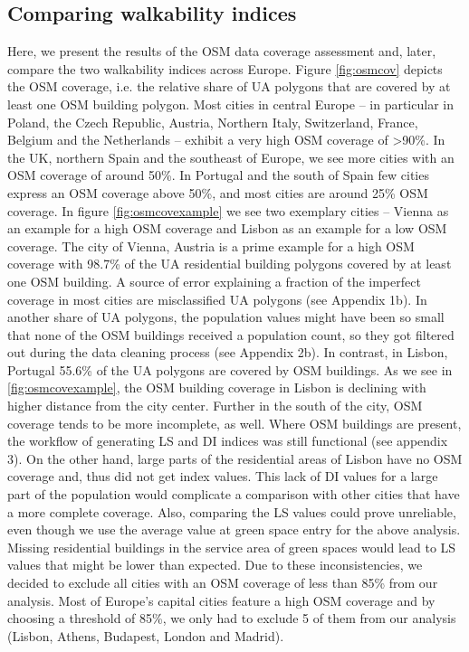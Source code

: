 \documentclass[10pt]{article}
\begin{document}
\subsection{Comparing walkability indices}
Here, we present the results of the OSM data coverage assessment and, later, compare the two walkability indices across Europe.
Figure \ref{fig:osmcov} depicts the OSM coverage, i.e. the relative share of UA polygons that are covered by at least one OSM building polygon. 
Most cities in central Europe – in particular in Poland, the Czech Republic, Austria, Northern Italy, Switzerland, France, Belgium and the Netherlands – exhibit a very high OSM coverage of \textgreater 90\%. 
In the UK, northern Spain and the southeast of Europe, we see more cities with an OSM coverage of around 50\%.
In Portugal and the south of Spain few cities express an OSM coverage above 50\%, and most cities are around 25\% OSM coverage.
In figure \ref{fig:osmcovexample} we see two exemplary cities – Vienna as an example for a high OSM coverage and Lisbon as an example for a low OSM coverage.
The city of Vienna, Austria is a prime example for a high OSM coverage with 98.7\% of the UA residential building polygons covered by at least one OSM building.
A source of error explaining a fraction of the imperfect coverage in most cities are misclassified UA polygons (see Appendix 1b).
In another share of UA polygons, the population values might have been so small that none of the OSM buildings received a population count, so they got filtered out during the data cleaning process (see Appendix 2b).
In contrast, in Lisbon, Portugal 55.6\% of the UA polygons are covered by OSM buildings. 
As we see in \ref{fig:osmcovexample}, the OSM building coverage in Lisbon is declining with higher distance from the city center.
Further in the south of the city, OSM coverage tends to be more incomplete, as well.
Where OSM buildings are present, the workflow of generating LS and DI indices was still functional (see appendix 3).
On the other hand, large parts of the residential areas of Lisbon have no OSM coverage and, thus did not get index values.
This lack of DI values for a large part of the population would complicate a comparison with other cities that have a more complete coverage.
Also, comparing the LS values could prove unreliable, even though we use the average value at green space entry for the above analysis.
Missing residential buildings in the service area of green spaces would lead to LS values that might be lower than expected.
Due to these inconsistencies, we decided to exclude all cities with an OSM coverage of less than 85\% from our analysis.
Most of Europe’s capital cities feature a high OSM coverage and by choosing a threshold of 85\%, we only had to exclude 5 of them from our analysis (Lisbon, Athens, Budapest, London and Madrid).  
\end{document}

